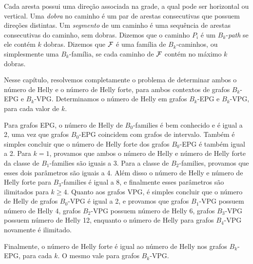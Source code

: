 Cada aresta possui uma direção associada na grade, a qual pode ser horizontal ou vertical. Uma  {\it dobra} no caminho é um par de arestas consecutivas que possuem direções distintas.  Um {\it segmento} de um caminho é uma sequência de arestas consecutivas do caminho, sem dobras. Dizemos que o caminho $P_i$ é um  $B_k$-{\it path} se ele contém $k$ dobras. Dizemos que $\cal {F}$ é uma família de $B_k$-caminhos, ou simplesmente  uma $B_k$-família, se cada caminho de $\cal {F}$ contém no máximo $k$ dobras. 

 Nesse capítulo, resolvemos completamente o problema de determinar ambos o número de Helly e o número de Helly forte, para ambos contextos de grafos $B_k$-EPG e $B_k$-VPG. Determinamos o número de Helly em grafos $B_k$-EPG e $B_k$-VPG, para cada valor de $k$.

Para grafos EPG, o número de Helly de $B_0$-families é bem conhecido e é igual a 2, uma vez que  grafos $B_0$-EPG coincidem com grafos de intervalo. Também é simples concluir que o número de Helly forte dos grafos $B_0$-EPG é também igual a 2. Para $k = 1$,   provamos que ambos o número de Helly e número de Helly forte da classe de $B_1$-families são iguais a 3. Para a classe de  $B_2$-families, provamos que esses dois parâmetros são iguais a 4. Além disso o número de Helly e número de Helly forte para $B_3$-families é igual a 8, e finalmente esses parâmetros são ilimitados para  $k \geq 4$. 
Quanto aos grafos VPG, é simples concluir que o número de Helly de grafos $B_0$-VPG é igual a 2, e provamos que grafos $B_1$-VPG possuem número de Helly  4, grafos $B_2$-VPG possuem número de Helly  6, grafos $B_3$-VPG possuem número de Helly 12, enquanto o número de Helly para grafos $B_4$-VPG novamente é ilimitado.

Finalmente, o número de Helly forte é igual ao número de Helly nos grafos  $B_k$-EPG, para cada $k$. O mesmo vale para grafos $B_k$-VPG.

